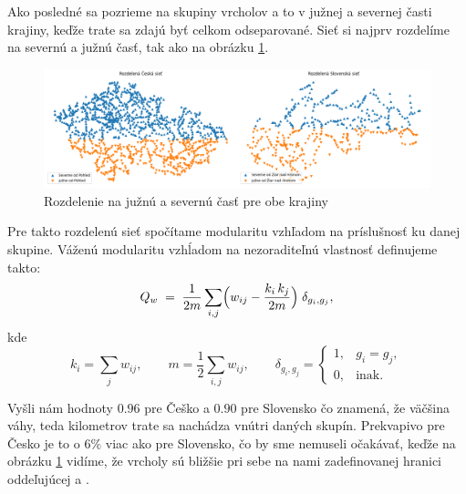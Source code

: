 \documentclass[main.tex]{subfiles}
\begin{document}
Ako posledné sa pozrieme na skupiny vrcholov a to v južnej a severnej časti krajiny, keďže trate sa zdajú byť celkom odseparované. Sieť si najprv rozdelíme na severnú a južnú časť, tak ako na obrázku \ref{obr:split}.

\begin{figure}
    \centerline{\includegraphics[width=1.2\textwidth]{images/south_north_split.png}}
    \caption{Rozdelenie na južnú a severnú časť pre obe krajiny}
    \label{obr:split}
\end{figure}

Pre takto rozdelenú sieť spočítame modularitu vzhľadom na príslušnosť ku danej skupine. Váženú modularitu vzhĺadom na nezoraditeľnú vlastnosť definujeme takto: 
 \[
Q_w \;=\;
\frac{1}{2m}
\sum_{i,j}
\Bigl(
  w_{ij}
  - \frac{k_i\,k_j}{2m}
\Bigr)
\;\delta_{g_i,g_j},
\]
kde
\[
k_i = \sum_j w_{ij},
\qquad
m = \frac{1}{2}\sum_{i,j}w_{ij},
\qquad
\delta_{g_i,g_j} =
\begin{cases}
1, & g_i = g_j,\\
0, & \text{inak.}
\end{cases}
\]

Vyšli nám hodnoty $0.96$ pre Češko a $0.90$ pre Slovensko čo znamená, že väčšina váhy, teda kilometrov trate sa nachádza vnútri daných skupín. Prekvapivo pre Česko je to o $6\%$ viac ako pre Slovensko, čo by sme nemuseli očakávať, keďže na obrázku \ref{obr:split} vidíme, že vrcholy sú bližšie pri sebe na nami zadefinovanej hranici oddeľujúcej  a .
\end{document}
